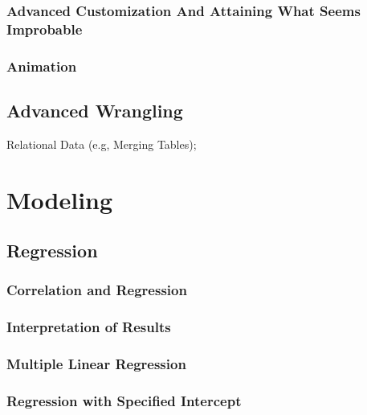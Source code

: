 \documentclass[
]{book}
\begin{document}
\hypertarget{advanced-customization-and-attaining-what-seems-improbable}{%
\subsection{Advanced Customization And Attaining What Seems Improbable}\label{advanced-customization-and-attaining-what-seems-improbable}}

\hypertarget{animation}{%
\subsection{Animation}\label{animation}}

\hypertarget{advanced-wrangling}{%
\section{Advanced Wrangling}\label{advanced-wrangling}}

Relational Data (e.g, Merging Tables);

\hypertarget{modeling}{%
\chapter{Modeling}\label{modeling}}

\hypertarget{regression}{%
\section{Regression}\label{regression}}

\hypertarget{correlation-and-regression}{%
\subsection{Correlation and Regression}\label{correlation-and-regression}}

\hypertarget{interpretation-of-results}{%
\subsection{Interpretation of Results}\label{interpretation-of-results}}

\hypertarget{multiple-linear-regression}{%
\subsection{Multiple Linear Regression}\label{multiple-linear-regression}}

\hypertarget{regression-with-specified-intercept}{%
\subsection{Regression with Specified Intercept}\label{regression-with-specified-intercept}}
\end{document}
